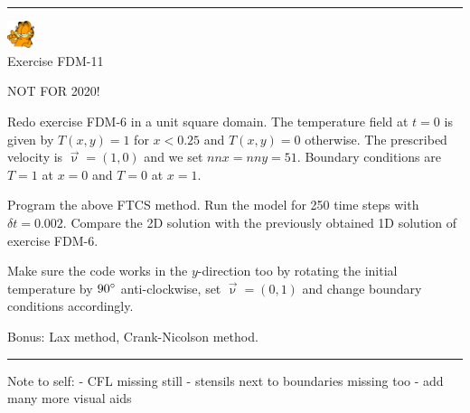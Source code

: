 \begin{center}
\begin{minipage}[t]{0.77\textwidth}
\par\noindent\rule{\textwidth}{0.4pt}

\begin{center}
\includegraphics[width=0.8cm]{images/garftr} \\
{\color{orange}Exercise FDM-11}
\end{center}

NOT FOR 2020! 

Redo exercise FDM-6 in a unit square domain. 
The temperature field at $t=0$ is 
given by $T(x,y)=1$ for $x<0.25$ and $T(x,y)=0$ otherwise. The prescribed 
velocity is $\vec\upnu=(1,0)$ and we set $nnx=nny=51$.
Boundary conditions are $T=1$ at $x=0$ and $T=0$ at $x=1$.

Program the above FTCS method. Run the model for 250 time steps with $\delta t=0.002$. 
Compare the 2D solution with the previously obtained 1D solution of exercise FDM-6.

Make sure the code works in the $y$-direction too by rotating the initial temperature 
by $90\degree$ anti-clockwise, set $\vec{\upnu}=(0,1)$ and change boundary conditions accordingly. 

Bonus: Lax method, Crank-Nicolson method.

\par\noindent\rule{\textwidth}{0.4pt}
\end{minipage}
\end{center}

Note to self:
- CFL missing still
- stensils next to boundaries missing too
- add many more visual aids










